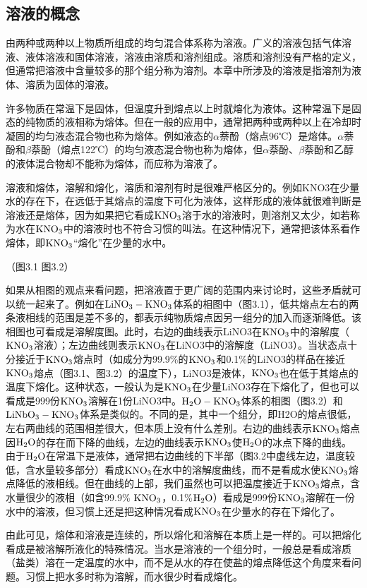 ﻿\subsection{溶液的概念}

由两种或两种以上物质所组成的均匀混合体系称为溶液。广义的溶液包括气体溶液、液体溶液和固体溶液，溶液由溶质和溶剂组成。溶质和溶剂没有严格的定义，但通常把溶液中含量较多的那个组分称为溶剂。本章中所涉及的溶液是指溶剂为液体、溶质为固体的溶液。

许多物质在常温下是固体，但温度升到熔点以上时就熔化为液体。这种常温下是固态的纯物质的液相称为熔体。但在一般的应用中，通常把两种或两种以上在冷却时凝固的均匀液态混合物也称为熔体。例如液态的$\alpha$萘酚（熔点96℃）是熔体。$\alpha$萘酚和$\beta$萘酚（熔点122℃）的均匀液态混合物也称为熔体，但$\alpha$萘酚、$\beta$萘酚和乙醇的液体混合物却不能称为熔体，而应称为溶液了。

溶液和熔体，溶解和熔化，溶质和溶剂有时是很难严格区分的。例如KNO3在少量水的存在下，在远低于其熔点的温度下可化为液体，这样形成的液体就很难判断是溶液还是熔体，因为如果把它看成$\rm KNO_3$溶于水的溶液时，则溶剂又太少，如若称为水在$\rm KNO_3$中的溶液时也不符合习惯的叫法。在这种情况下，通常把该体系看作熔体，即$\rm KNO_3$“熔化”在少量的水中。

（图3.1 图3.2）

如果从相图的观点来看问题，把溶液置于更广阔的范围内来讨论时，这些矛盾就可以统一起来了。例如在$\rm LiNO_3-KNO_3$体系的相图中（图3.1），低共熔点左右的两条液相线的范围是差不多的，都表示纯物质熔点因另一组分的加入而逐渐降低。该相图也可看成是溶解度图。此时，右边的曲线表示LiNO3在$\rm KNO_3$中的溶解度（$\rm KNO_3$溶液）；左边曲线则表示$\rm KNO_3$在LiNO3中的溶解度（LiNO3）。当状态点十分接近于$\rm KNO_3$熔点时（如成分为99.9\%的$\rm KNO_3$和0.1\%的LiNO3的样品在接近$\rm KNO_3$熔点（图3.1、图3.2）的温度下），LiNO3是液体，$\rm KNO_3$也在低于其熔点的温度下熔化。这种状态，一般认为是$\rm KNO_3$在少量LiNO3存在下熔化了，但也可以看成是999份$\rm KNO_3$溶解在1份LiNO3中。$\rm H_2O-KNO_3$体系的相图（图3.2）和$\rm LiNbO_3-KNO_3$体系是类似的。不同的是，其中一个组分，即H2O的熔点很低，左右两曲线的范围相差很大，但本质上没有什么差别。右边的曲线表示$\rm KNO_3$熔点因$\rm H_2O$的存在而下降的曲线，左边的曲线表示$\rm KNO_3$使$\rm H_2O$的冰点下降的曲线。由于$\rm H_2O$在常温下是液体，通常把右边曲线的下半部（图3.2中虚线左边，温度较低，含水量较多部分）看成$\rm KNO_3$在水中的溶解度曲线，而不是看成水使$\rm KNO_3$熔点降低的液相线。但在曲线的上部，我们虽然也可以把温度接近于$\rm KNO_3$熔点，含水量很少的液相（如含99.9\% $\rm KNO_3$，0.1\%$\rm H_2O$）看成是999份$\rm KNO_3$溶解在一份水中的溶液，但习惯上还是把这种情况看成$\rm KNO_3$在少量水的存在下熔化了。

由此可见，熔体和溶液是连续的，所以熔化和溶解在本质上是一样的。可以把熔化看成是被溶解所液化的特殊情况。当水是溶液的一个组分时，一般总是看成溶质（盐类）溶在一定温度的水中，而不是从水的存在使盐的熔点降低这个角度来看问题。习惯上把水多时称为溶解，而水很少时看成熔化。


